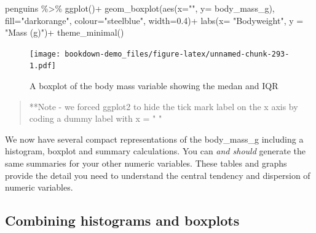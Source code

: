 \documentclass[
]{book}
\newenvironment{Shaded}{\begin{snugshade}}{\end{snugshade}}
\newcommand{\AttributeTok}[1]{\textcolor[rgb]{0.77,0.63,0.00}{#1}}
\newcommand{\FloatTok}[1]{\textcolor[rgb]{0.00,0.00,0.81}{#1}}
\newcommand{\FunctionTok}[1]{\textcolor[rgb]{0.00,0.00,0.00}{#1}}
\newcommand{\NormalTok}[1]{#1}
\newcommand{\SpecialCharTok}[1]{\textcolor[rgb]{0.00,0.00,0.00}{#1}}
\newcommand{\StringTok}[1]{\textcolor[rgb]{0.31,0.60,0.02}{#1}}
\begin{document}
\begin{Shaded}
\begin{Highlighting}[]
\NormalTok{penguins }\SpecialCharTok{\%\textgreater{}\%} 
  \FunctionTok{ggplot}\NormalTok{()}\SpecialCharTok{+}
  \FunctionTok{geom\_boxplot}\NormalTok{(}\FunctionTok{aes}\NormalTok{(}\AttributeTok{x=}\StringTok{""}\NormalTok{,}
                   \AttributeTok{y=}\NormalTok{ body\_mass\_g),}
               \AttributeTok{fill=}\StringTok{"darkorange"}\NormalTok{,}
               \AttributeTok{colour=}\StringTok{"steelblue"}\NormalTok{,}
               \AttributeTok{width=}\FloatTok{0.4}\NormalTok{)}\SpecialCharTok{+}
  \FunctionTok{labs}\NormalTok{(}\AttributeTok{x=} \StringTok{"Bodyweight"}\NormalTok{,}
       \AttributeTok{y =} \StringTok{"Mass (g)"}\NormalTok{)}\SpecialCharTok{+}
  \FunctionTok{theme\_minimal}\NormalTok{()}
\end{Highlighting}
\end{Shaded}

\begin{figure}
\centering
\texttt{[image: bookdown-demo\_files/figure-latex/unnamed-chunk-293-1.pdf]}
\caption{\label{fig:unnamed-chunk-293}A boxplot of the body mass variable showing the medan and IQR}
\end{figure}

\begin{quote}
**Note - we forced ggplot2 to hide the tick mark label on the x axis by coding a dummy label with x = " "
\end{quote}

We now have several compact representations of the body\_mass\_g including a histogram, boxplot and summary calculations. You can \emph{and should} generate the same summaries for your other numeric variables. These tables and graphs provide the detail you need to understand the central tendency and dispersion of numeric variables.

\hypertarget{combining-histograms-and-boxplots}{%
\subsection{Combining histograms and boxplots}\label{combining-histograms-and-boxplots}}
\end{document}
